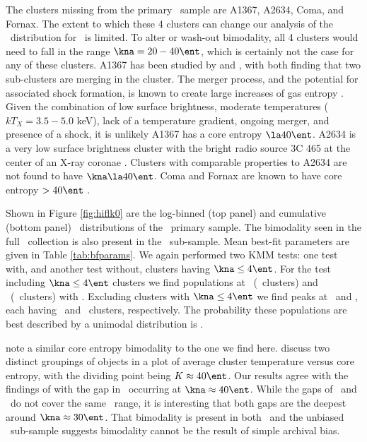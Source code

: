 \documentclass[apj]{emulateapj}
\begin{document}
The clusters missing from the primary \hifl\ sample are A1367, A2634,
Coma, and Fornax. The extent to which these 4 clusters can change our
analysis of the \kna\ distribution for \hifl\ is limited.  To alter or
wash-out bimodality, all 4 clusters would need to fall in the range
$\kna = 20-40 \ent$, which is certainly not the case for any of these
clusters. A1367 has been studied by \citet{1998ApJ...500..138D} and
\citet{2002ApJ...576..708S}, with both finding that two sub-clusters
are merging in the cluster. The merger process, and the potential for
associated shock formation, is known to create large increases of gas
entropy \citep{2007MNRAS.376..497M}. Given the combination of low
surface brightness, moderate temperatures ($kT_X = 3.5-5.0$ keV), lack
of a temperature gradient, ongoing merger, and presence of a shock, it
is unlikely A1367 has a core entropy $\la 40 \ent$. A2634 is a very
low surface brightness cluster with the bright radio source 3C 465 at
the center of an X-ray coronae \citep{coronae}. Clusters with
comparable properties to A2634 are not found to have $\kna \la 40
\ent$. Coma and Fornax are known to have core entropy $> 40 \ent$
\citep[][C. Scharf, private communication]{2008arXiv0802.1864R}.

Shown in Figure \ref{fig:hiflk0} are the log-binned (top panel) and
cumulative (bottom panel) \kna\ distributions of the \hifl\ primary
sample. The bimodality seen in the full \accept\ collection is also
present in the \hifl\ sub-sample. Mean best-fit parameters are given
in Table \ref{tab:bfparams}. We again performed two KMM tests: one
test with, and another test without, clusters having $\kna \le 4
\ent$. For the test including $\kna \le 4 \ent$ clusters we find
populations at \hiflkmma\ (\hiflkmmc\ clusters) and \hiflkmmb\
(\hiflkmmd\ clusters) with \hiflkmme. Excluding clusters with $\kna
\le 4 \ent$ we find peaks at \hiflkmmf\ and \hiflkmmg, each having
\hiflkmmh\ and \hiflkmmi\ clusters, respectively. The probability
these populations are best described by a unimodal distribution is
\hiflkmmj.

\citet{2007hvcg.conf...42H} note a similar core entropy bimodality to
the one we find here. \citet{2007hvcg.conf...42H} discuss two distinct
groupings of objects in a plot of average cluster temperature versus
core entropy, with the dividing point being $K \approx 40 \ent$. Our
results agree with the findings of \citet{2007hvcg.conf...42H} with
the gap in \kna\ occurring at $\kna \approx 40 \ent$. While the gaps
of \accept\ and \hifl\ do not cover the same \kna\ range, it is
interesting that both gaps are the deepest around $\kna \approx 30
\ent$. That bimodality is present in both \accept\ and the unbiased
\hifl\ sub-sample suggests bimodality cannot be the result of simple
archival bias.
\end{document}

